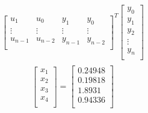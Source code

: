 \documentclass[12pt,letterpaper, onecolumn]{exam}
\begin{document}
\begin{questions}
\begin{parts}
\begin{subparts}
{\begin{equation}
\begin{split}
\begin{bmatrix}
                            u_{1}   & u_{0}   & y_{1}   & y_{0}   \\
                            \vdots  & \vdots  & \vdots  & \vdots  \\
                            u_{n-1} & u_{n-2} & y_{n-1} & y_{n-2} \\
                        \end{bmatrix}^T \begin{bmatrix}
                            y_0    \\
                            y_1    \\
                            y_2    \\
                            \vdots \\
                            y_n    \\
                        \end{bmatrix}\\
                    \end{split}
                    \label{}
                \end{equation}
                \begin{equation}
                    \begin{bmatrix}
                        x_1 \\
                        x_2 \\
                        x_3 \\
                        x_4 \\
                    \end{bmatrix}  =
                    \begin{bmatrix}
                        0.24948 \\
                        0.19818 \\
                        1.8931  \\
                        0.94336 \\
                    \end{bmatrix}
                \end{equation}
            }


            \solution{}


            \solution{}


\end{subparts}
\end{parts}
\end{questions}
\end{document}
